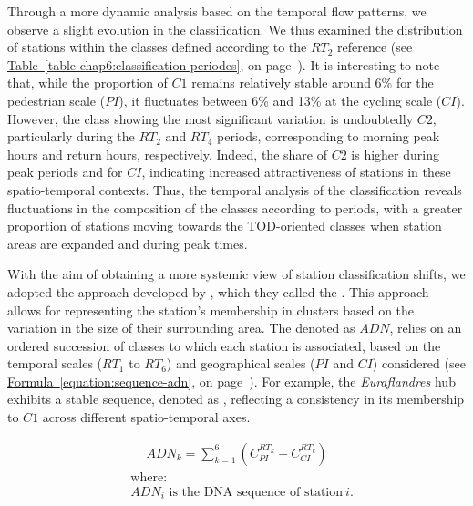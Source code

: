 \begin{refsegment}

Through a more dynamic analysis based on the temporal flow patterns, we observe a slight evolution in the classification. We thus examined the distribution of stations within the classes defined according to the \(RT_{2}\) reference (see \hyperref[table-chap6:classification-periodes]{Table~\ref{table-chap6:classification-periodes}}, on page~\pageref{table-chap6:classification-periodes}). It is interesting to note that, while the proportion of \(C1\) remains relatively stable around 6\% for the pedestrian scale (\(PI\)), it fluctuates between 6\% and 13\% at the cycling scale (\(CI\)). However, the class showing the most significant variation is undoubtedly \(C2\), particularly during the \(RT_{2}\) and \(RT_{4}\) periods, corresponding to morning peak hours and return hours, respectively. Indeed, the share of \(C2\) is higher during peak periods and for \(CI\), indicating increased attractiveness of stations in these spatio-temporal contexts. Thus, the temporal analysis of the classification reveals fluctuations in the composition of the classes according to periods, with a greater proportion of stations moving towards the \acrshort{TOD}-oriented classes when station areas are expanded and during peak times.%

With the aim of obtaining a more systemic view of station classification shifts, we adopted the approach developed by \textcolor{blue}{\textcite[518]{caset_measuring_2018}}, which they called the . This approach allows for representing the station's membership in clusters based on the variation in the size of their surrounding area. The  denoted as \(ADN\), relies on an ordered succession of classes to which each station is associated, based on the temporal scales (\(RT_{1}\) to \(RT_{6}\)) and geographical scales (\(PI\) and \(CI\)) considered (see \hyperref[equation:sequence-adn]{Formula~\ref{equation:sequence-adn}}, on page~\pageref{equation:sequence-adn}). For example, the \textsl{Euraflandres} hub exhibits a stable sequence, denoted as , reflecting a consistency in its membership to \(C1\) across different spatio-temporal axes.%

\begin{equation}
\label{equation:sequence-adn}
\begin{aligned}
ADN_k = \sum_{k=1}^{6} \left( C^{RT_k}_{PI} + C^{RT_k}_{CI} \right)
\end{aligned}
\end{equation}
\begin{align*}
    &\text{where:} \\
    &ADN_i \text{ is the DNA sequence of station}~i\text{.}\\
\end{align*}%


\end{refsegment}
